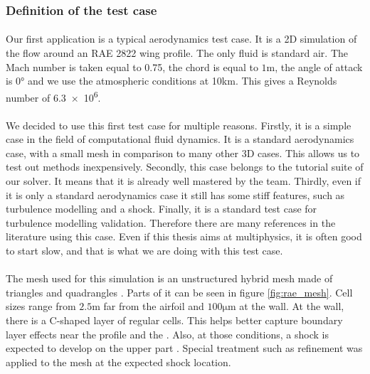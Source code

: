       \subsubsection{Definition of the test case}



        \paragraph{}
        Our first application is a typical aerodynamics test case.
        It is a 2D simulation of the flow around an RAE 2822 wing profile.
        The only fluid is standard air.
        The Mach number is taken equal to 0.75, the chord is equal to $1\si{\meter}$, the angle of attack is $0\si{\degree}$ and we use the atmospheric conditions at 10km.
        This gives a Reynolds number of \num{6.3e6}.

        \paragraph{}
        We decided to use this first test case for multiple reasons.
        Firstly, it is a simple case in the field of computational fluid dynamics.
        It is a standard aerodynamics case, with a small mesh in comparison to many other 3D cases.
        This allows us to test out methods inexpensively.
        Secondly, this case belongs to the tutorial suite of our solver.
        It means that it is already well mastered by the team.
        Thirdly, even if it is only a standard aerodynamics case it still has some stiff features, such as turbulence modelling and a shock.
        Finally, it is a standard test case for turbulence modelling validation.
        Therefore there are many references in the literature using this case. 
        Even if this thesis aims at multiphysics, it is often good to start slow, and that is what we are doing with this test case.

        \paragraph{}
        The mesh used for this simulation is an unstructured hybrid mesh made of triangles and quadrangles .
        Parts of it can be seen in figure \ref{fig:rae_mesh}.
        Cell sizes range from $2.5\si{\meter}$ far from the airfoil and $100\si{\micro\meter}$ at the wall.
        At the wall, there is a C-shaped layer of regular cells.
        This helps better capture boundary layer effects near the profile and the .
        Also, at those conditions, a shock is expected to develop on the upper part .
        Special treatment such as refinement was applied to the mesh at the expected shock location.

